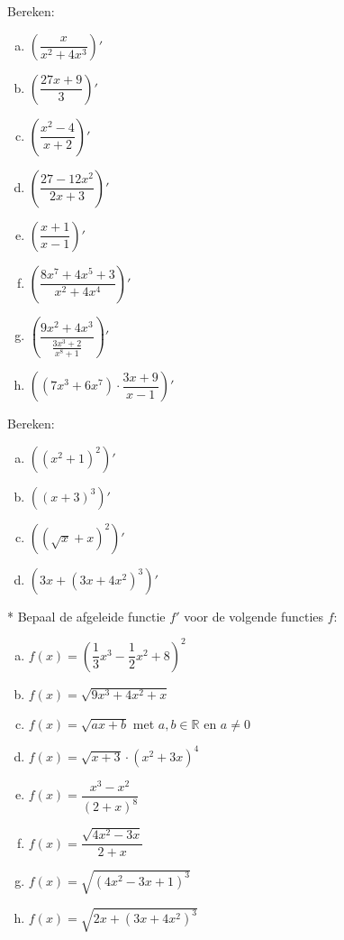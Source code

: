 \documentclass[a4paper,12pt,twoside]{article}
\begin{document}
\begin{oefening}
  Bereken:
  \begin{multicols}{2}
  \begin{enumerate}[(a)]
  \itemsep1em
  \item $\displaystyle\left( \dfrac{x}{x^2+4x^3} \right)'$
  \item $\displaystyle\left( \dfrac{27x+9}{3} \right)'$
  \item $\displaystyle\left( \dfrac{x^2-4}{x+2} \right)'$
  \item $\displaystyle\left( \dfrac{27-12x^2}{2x+3} \right)'$
  \item $\displaystyle\left( \dfrac{x+1}{x-1} \right)'$
  \item $\displaystyle\left( \dfrac{8x^7+4x^5+3}{x^2+4x^4} \right)'$
  \item $\displaystyle\left( \dfrac{9x^2+4x^3}{\frac{3x^3+2}{x^8+1}} \right)'$
  \item $\displaystyle\left( (7x^3+6x^7)\cdot\dfrac{3x+9}{x-1} \right)'$
  \end{enumerate}
  \end{multicols}
\end{oefening}

\begin{oefening}
  Bereken:
  \begin{multicols}{2}
  \begin{enumerate}[(a)]
  \itemsep1em
  \item $\displaystyle\left( (x^2+1)^2 \right)'$
  \item $\displaystyle\left( (x+3)^3 \right)'$
  \item $\displaystyle\left( (\sqrt{x}+x)^2 \right)'$
  \item $\displaystyle\left( 3x+(3x+4x^2)^3 \right)'$
  \end{enumerate}
  \end{multicols}
\end{oefening}

\begin{oefening}*
  Bepaal de afgeleide functie $f'$ voor de volgende functies $f$:
  \begin{multicols}{2}
  \begin{enumerate}[(a)]
  \itemsep1em
  \item $\displaystyle f(x)=(\dfrac{1}{3}x^3-\dfrac{1}{2}x^2+8)^2$
  \item $\displaystyle f(x)=\sqrt{9x^3+4x^2+x}$
  \item $\displaystyle f(x)=\sqrt{ax+b}$ met $a,b\in\mathbb{R}$ en $a\neq 0$
  \item $\displaystyle f(x)=\sqrt{x+3}\cdot(x^2+3x)^4$
  \item $\displaystyle f(x)=\dfrac{x^3-x^2}{(2+x)^8}$
  \item $\displaystyle f(x)=\dfrac{\sqrt{4x^2-3x}}{2+x}$
  \item $\displaystyle f(x)=\sqrt{(4x^2-3x+1)^3}$
  \item $\displaystyle f(x)=\sqrt{2x+(3x+4x^2)^3}$
  \end{enumerate}
  \end{multicols}
\end{oefening}
\end{document}
